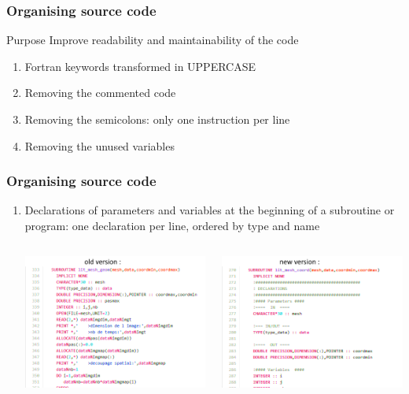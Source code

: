 \documentclass[10p]{beamer}
\begin{document}
\begin{frame}
\frametitle{Organising source code}
\begin{block}{Purpose}
Improve readability and maintainability of the code
\end{block}
\begin{enumerate}
\item Fortran keywords transformed in UPPERCASE
\item Removing the commented code
\item Removing the semicolons: only one instruction per line
\item Removing the unused variables
\end{enumerate}
\end{frame}

\begin{frame}
\frametitle{Organising source code}
\begin{enumerate}
\item Declarations of parameters and variables at the beginning of a subroutine or program: one declaration per line, ordered by type and name
\begin{columns}
\begin{column}{150 pt}
\includegraphics[scale=0.60]{Image/before_refactoring_template.png}
\end{column}
\begin{column}{150 pt}
\includegraphics[scale=0.60]{Image/after_refactoring_template.png}

\end{column}
\end{columns}
\end{enumerate}
\end{frame}
\end{document}
